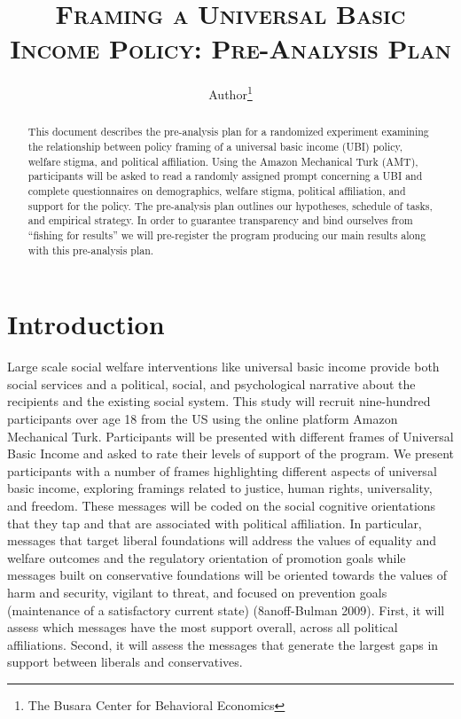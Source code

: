 \documentclass[11pt, a4paper]{article}\usepackage[]{graphicx}\usepackage[]{color}
\begin{document}
\title{\textsc{Framing a Universal Basic Income Policy: Pre-Analysis Plan}}
\author{Author\footnote{The Busara Center for Behavioral Economics}}

\maketitle

\begin{abstract}

    This document describes the pre-analysis plan for a randomized experiment examining the relationship between policy framing of a universal basic income (UBI) policy, welfare stigma, and political affiliation. Using the Amazon Mechanical Turk (AMT), participants will be asked to read a randomly assigned prompt concerning a UBI and complete questionnaires on demographics, welfare stigma, political affiliation, and support for the policy. The pre-analysis plan outlines our hypotheses, schedule of tasks, and empirical strategy. In order to guarantee transparency and bind ourselves from ``fishing for results'' we will pre-register the program producing our main results along with this pre-analysis plan. %

\end{abstract}

\newpage

%

\section{Introduction}

    Large scale social welfare interventions like universal basic income provide both social services and a political, social, and psychological narrative about the recipients and the existing social system. This study will recruit nine-hundred participants over age 18 from the US using the online platform Amazon Mechanical Turk. Participants will be presented with different frames of Universal Basic Income and asked to rate their levels of support of the program. We present participants with a number of frames highlighting different aspects of universal basic income, exploring framings related to justice, human rights, universality, and freedom. These messages will be coded on the social cognitive orientations that they tap and that are associated with political affiliation. In particular, messages that target liberal foundations will address the values of equality and welfare outcomes and the regulatory orientation of promotion goals while messages built on conservative foundations will be oriented towards the values of harm and security, vigilant to threat, and focused on prevention goals (maintenance of a satisfactory current state) (8anoff-Bulman 2009). First, it will assess which messages have the most support overall, across all political affiliations. Second, it will assess the messages that generate the largest gaps in support between liberals and conservatives.
\end{document}
